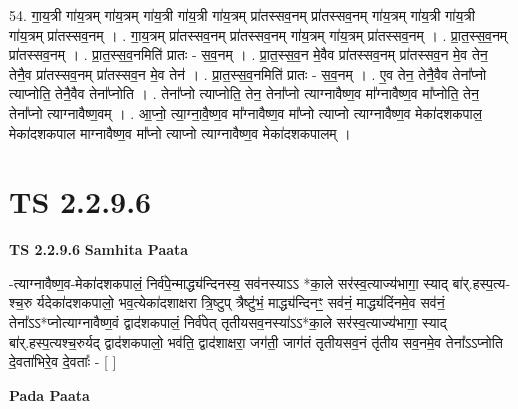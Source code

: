 \documentclass[17pt]{extarticle}
\begin{document}
54. गा॒य॒त्री गा॑य॒त्रम् गा॑य॒त्रम् गा॑य॒त्री गा॑य॒त्री गा॑य॒त्रम् प्रा॑तस्सव॒नम् प्रा॑तस्सव॒नम् गा॑य॒त्रम् गा॑य॒त्री गा॑य॒त्री गा॑य॒त्रम् प्रा॑तस्सव॒नम् । . गा॒य॒त्रम् प्रा॑तस्सव॒नम् प्रा॑तस्सव॒नम् गा॑य॒त्रम् गा॑य॒त्रम् प्रा॑तस्सव॒नम् । . प्रा॒त॒स्स॒व॒नम् प्रा॑तस्सव॒नम् । . प्रा॒त॒स्स॒व॒नमिति॑ प्रातः - स॒व॒नम् । . प्रा॒त॒स्स॒व॒न मे॒वैव प्रा॑तस्सव॒नम् प्रा॑तस्सव॒न मे॒व तेन॒ तेनै॒व प्रा॑तस्सव॒नम् प्रा॑तस्सव॒न मे॒व तेन॑ । . प्रा॒त॒स्स॒व॒नमिति॑ प्रातः - स॒व॒नम् । . ए॒व तेन॒ तेनै॒वैव तेना᳚प्नो त्याप्नोति॒ तेनै॒वैव तेना᳚प्नोति । . तेना᳚प्नो त्याप्नोति॒ तेन॒ तेना᳚प्नो त्याग्नावैष्ण॒व मा᳚ग्नावैष्ण॒व मा᳚प्नोति॒ तेन॒ तेना᳚प्नो त्याग्नावैष्ण॒वम् । . आ॒प्नो॒ त्या॒ग्ना॒वै॒ष्ण॒व मा᳚ग्नावैष्ण॒व मा᳚प्नो त्याप्नो त्याग्नावैष्ण॒व मेका॑दशकपाल॒ मेका॑दशकपाल माग्नावैष्ण॒व मा᳚प्नो त्याप्नो त्याग्नावैष्ण॒व मेका॑दशकपालम् । \newline
\pagebreak
{}

\section{ TS 2.2.9.6 }

\textbf{TS 2.2.9.6 } \newline
\textbf{Samhita Paata} \newline

-त्याग्नावैष्ण॒व-मेका॑दशकपालं॒ निर्व॑पे॒न्माद्ध्य॑न्दिनस्य॒ सव॑नस्याऽऽ *का॒ले सर॑स्व॒त्याज्य॑भागा॒ स्याद् बा॑र्.हस्प॒त्य-श्च॒रु र्यदेका॑दशकपालो॒ भव॒त्येका॑दशाक्षरा त्रि॒ष्टुप् त्रैष्टु॑भं॒ माद्ध्य॑न्दिनꣳ॒॒ सव॑नं॒ माद्ध्य॑दिंनमे॒व सव॑नं॒ तेना᳚ऽऽ*प्नोत्याग्नावैष्ण॒वं द्वाद॑शकपालं॒ निर्व॑पेत् तृतीयसव॒नस्या॑ऽऽ*का॒ले सर॑स्व॒त्याज्य॑भागा॒ स्याद् बा॑र्.हस्प॒त्यश्च॒रुर्यद् द्वाद॑शकपालो॒ भव॑ति॒ द्वाद॑शाक्षरा॒ जग॑ती॒ जाग॑तं तृतीयसव॒नं तृ॑तीय सव॒नमे॒व तेना᳚ऽऽप्नोति दे॒वता॑भिरे॒व दे॒वताः᳚ - [  ] \newline

\textbf{Pada Paata} \newline
\end{document}
